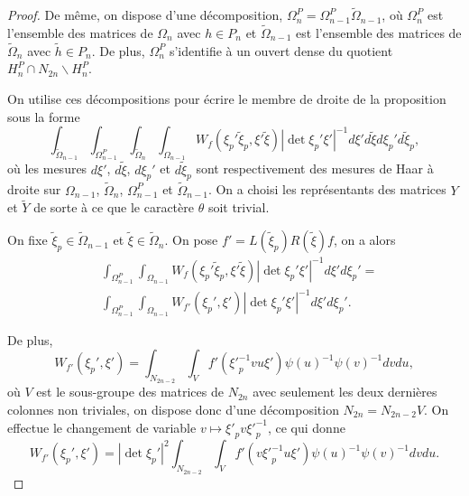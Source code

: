 \documentclass{amsart}
\begin{document}
\begin{proof}
De même, on dispose d'une décomposition, $\Omega^P_n = \Omega^P_{n-1} \widetilde{\Omega}_{n-1}$, où $\Omega^P_n$ est l'ensemble des matrices de $\Omega_n$ avec $h \in P_n$ et $\widetilde{\Omega}_{n-1}$ est l'ensemble des matrices de $\widetilde{\Omega}_n$ avec $\widetilde{h} \in P_n$. De plus, $\Omega^P_n$ s'identifie à un ouvert dense du quotient $H^P_n \cap N_{2n} \backslash{H^P_n}$.

On utilise ces décompositions pour écrire le membre de droite de la proposition sous la forme
\begin{equation}
\int_{\widetilde{\Omega}_{n-1}} \int_{\Omega^P_{n-1}} \int_{\widetilde{\Omega}_n} \int_{\Omega_{n-1}} W_f(\xi_p'\widetilde{\xi}_p, \xi'\widetilde{\xi}) |\det \xi_p'\xi'|^{-1} d\xi' d\widetilde{\xi} d\xi_p' d\widetilde{\xi}_p,
\end{equation}
où les mesures $d\xi'$, $d\widetilde{\xi}$, $d\xi_p'$ et $d\widetilde{\xi}_p$ sont respectivement des mesures de Haar à droite sur $\Omega_{n-1}$, $\widetilde{\Omega}_n$,  $\Omega^P_{n-1}$ et $\widetilde{\Omega}_{n-1}$. On a choisi les représentants des matrices $Y$ et $\widetilde{Y}$ de sorte à ce que le caractère $\theta$ soit trivial.

On fixe $\widetilde{\xi}_p \in \widetilde{\Omega}_{n-1}$ et $\widetilde{\xi} \in \widetilde{\Omega}_n$. On pose $f' = L(\widetilde{\xi}_p)R(\widetilde{\xi})f$, on a alors
 \begin{equation}
 \begin{split}
 & \int_{\Omega^P_{n-1}} \int_{\Omega_{n-1}} W_f(\xi_p'\widetilde{\xi}_p, \xi'\widetilde{\xi}) |\det \xi_p'\xi'|^{-1} d\xi' d\xi_p'= \\
 & \int_{\Omega^P_{n-1}} \int_{\Omega_{n-1}} W_{f'}(\xi_p', \xi') |\det \xi_p'\xi'|^{-1} d\xi' d\xi_p'.
 \end{split}
 \end{equation}

De plus,
 \begin{equation}
 W_{f'}(\xi_p', \xi') = \int_{N_{2n-2}} \int_V f'({\xi'}_p^{-1} v u \xi') \psi(u)^{-1}\psi(v)^{-1} dv du,
 \end{equation}
 où $V$ est le sous-groupe des matrices de $N_{2n}$ avec seulement les deux dernières colonnes non triviales, on dispose donc d'une décomposition $N_{2n} = N_{2n-2}V$. On effectue le changement de variable $v \mapsto {\xi'}_p v {\xi'}_p^{-1}$, ce qui donne
 \begin{equation}
 W_{f'}(\xi_p', \xi') = |\det \xi_p'|^{2}\int_{N_{2n-2}} \int_V f'(v {\xi'}_p^{-1} u \xi') \psi(u)^{-1}\psi(v)^{-1} dv du.
 \end{equation}


\end{proof}
\end{document}
